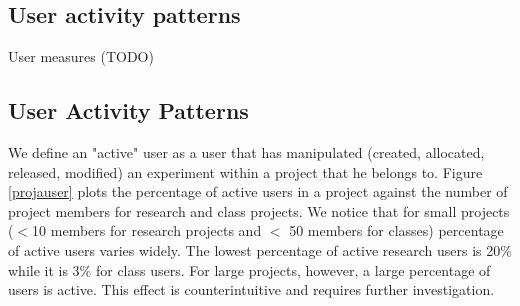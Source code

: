 \documentclass[10pt]{article}
\begin{document}
\subsection{User activity patterns}
User measures (TODO)


\subsection*{User Activity Patterns}
We define an "active" user as a user that has manipulated (created,
allocated, released, modified) an experiment within a project that
he belongs to. Figure \ref{projauser} plots the percentage of active users
in a project against the number of project members for research and
class projects. We notice that for small projects ($<$10 members for
research projects and $<$ 50 members for classes) percentage of active
users varies widely. The lowest percentage of active research users is
20\% while it is 3\% for class users. For large projects, however, a
large percentage of users is active. This effect is counterintuitive and
requires further investigation.
\end{document}
